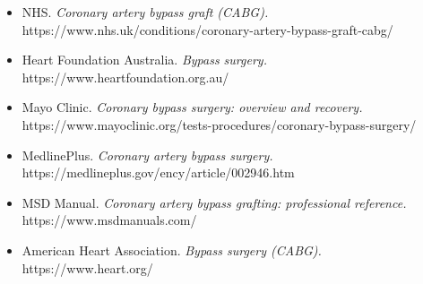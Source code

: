 \begin{itemize}
    \item NHS. \textit{Coronary artery bypass graft (CABG).} https://www.nhs.uk/conditions/coronary-artery-bypass-graft-cabg/
    \item Heart Foundation Australia. \textit{Bypass surgery.} https://www.heartfoundation.org.au/
    \item Mayo Clinic. \textit{Coronary bypass surgery: overview and recovery.} https://www.mayoclinic.org/tests-procedures/coronary-bypass-surgery/
    \item MedlinePlus. \textit{Coronary artery bypass surgery.} https://medlineplus.gov/ency/article/002946.htm
    \item MSD Manual. \textit{Coronary artery bypass grafting: professional reference.} https://www.msdmanuals.com/
    \item American Heart Association. \textit{Bypass surgery (CABG).} https://www.heart.org/
\end{itemize}

